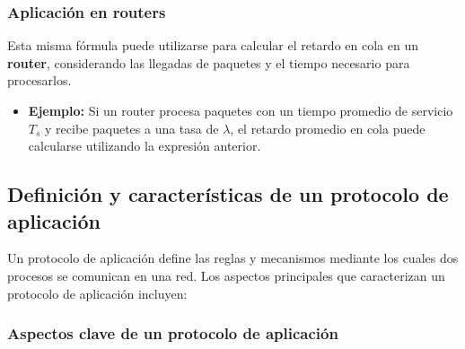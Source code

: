 \documentclass[a4paper,12pt]{article}
\begin{document}
\subsubsection{Aplicación en routers}

Esta misma fórmula puede utilizarse para calcular el retardo en cola en un \textbf{router}, considerando las llegadas de paquetes y el tiempo necesario para procesarlos.

\begin{itemize}
    \item \textbf{Ejemplo:} Si un router procesa paquetes con un tiempo promedio de servicio \(T_s\) y recibe paquetes a una tasa de \(\lambda\), el retardo promedio en cola puede calcularse utilizando la expresión anterior.
\end{itemize}

\subsection{Definición y características de un protocolo de aplicación}

Un protocolo de aplicación define las reglas y mecanismos mediante los cuales dos procesos se comunican en una red. Los aspectos principales que caracterizan un protocolo de aplicación incluyen:

\subsubsection{Aspectos clave de un protocolo de aplicación}
\end{document}
